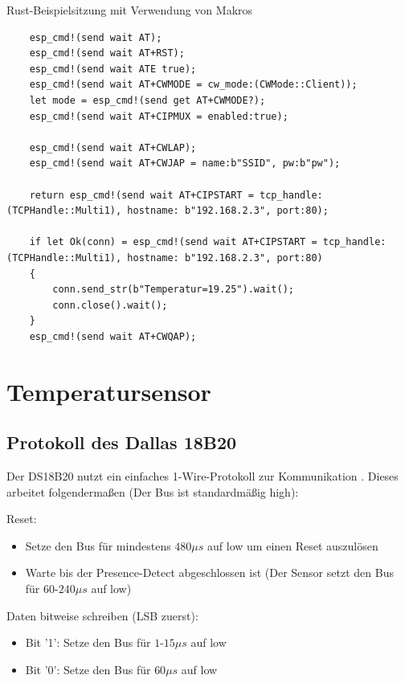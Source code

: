 \documentclass
[ 12pt,
  parskip=half %
]{scrreprt}
\newenvironment{mylisting}[1][H]
{\captionsetup{aboveskip=-0.2\normalbaselineskip}\begin{listing}[#1]}
{\end{listing}}
\begin{document}
\begin{mylisting}
	\caption{Rust-Beispielsitzung mit Verwendung von Makros}
	\label{listing:at-example-rust-macros}
	\begin{verbatim}
	esp_cmd!(send wait AT);
	esp_cmd!(send wait AT+RST);	
	esp_cmd!(send wait ATE true);
	esp_cmd!(send wait AT+CWMODE = cw_mode:(CWMode::Client));
	let mode = esp_cmd!(send get AT+CWMODE?); 
	esp_cmd!(send wait AT+CIPMUX = enabled:true);
	
	esp_cmd!(send wait AT+CWLAP);	
	esp_cmd!(send wait AT+CWJAP = name:b"SSID", pw:b"pw");
	
	return esp_cmd!(send wait AT+CIPSTART = tcp_handle:(TCPHandle::Multi1), hostname: b"192.168.2.3", port:80);

	if let Ok(conn) = esp_cmd!(send wait AT+CIPSTART = tcp_handle:(TCPHandle::Multi1), hostname: b"192.168.2.3", port:80) 
	{
		conn.send_str(b"Temperatur=19.25").wait();
		conn.close().wait();
	}
	esp_cmd!(send wait AT+CWQAP);
	\end{verbatim}
\end{mylisting} 


\section{Temperatursensor}

\subsection{Protokoll des Dallas 18B20}

Der DS18B20 nutzt ein einfaches 1-Wire-Protokoll zur Kommunikation \cite{ds18b20-datasheet}. Dieses arbeitet folgendermaßen (Der Bus ist standardmäßig high):

Reset:
\begin{itemize}
	\item Setze den Bus für mindestens $480 \mu{s}$ auf low um einen Reset auszulösen
	\item Warte bis der Presence-Detect abgeschlossen ist (Der Sensor setzt den Bus für $60$-$240 \mu{s}$ auf low)
\end{itemize}

Daten bitweise schreiben (LSB zuerst):
\begin{itemize}
	\item Bit '1': Setze den Bus für $1$-$15 \mu{s}$ auf low
	\item Bit '0': Setze den Bus für $60 \mu{s}$ auf low
\end{itemize}
\end{document}
